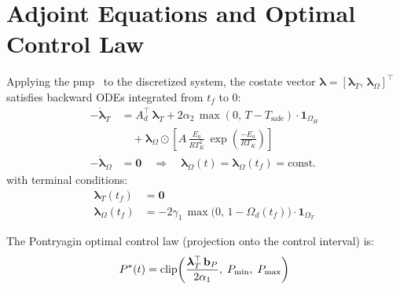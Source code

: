\section{Adjoint Equations and Optimal Control Law}

Applying the \gls{pmp}~\cite{pontryagin2018mathematical} to the
discretized system, the costate vector
$\boldsymbol{\lambda} = [\boldsymbol{\lambda}_T,\, \boldsymbol{\lambda}_\Omega]^\top$
satisfies backward ODEs integrated from $t_f$ to $0$:
\begin{align}
    -\dot{\boldsymbol{\lambda}}_T
    &= A_d^\top\,\boldsymbol{\lambda}_T
       + 2\alpha_2\,\max(0,\, T - T_{\text{safe}})\cdot\mathbf{1}_{\Omega_H}
       \nonumber \\
    &\quad + \boldsymbol{\lambda}_\Omega \odot
       \left[A\,\frac{E_a}{R T_K^2}\,
             \exp\!\left(\frac{-E_a}{R T_K}\right)\right]
    \label{eq:adjoint-T} \\[4pt]
    -\dot{\boldsymbol{\lambda}}_\Omega &= \mathbf{0}
    \quad\Rightarrow\quad
    \boldsymbol{\lambda}_\Omega(t) = \boldsymbol{\lambda}_\Omega(t_f) = \text{const.}
    \label{eq:adjoint-Omega}
\end{align}
with terminal conditions:
\begin{align}
    \boldsymbol{\lambda}_T(t_f) &= \mathbf{0} \\
    \boldsymbol{\lambda}_\Omega(t_f)
    &= -2\gamma_1\,\max\bigl(0,\,1 - \Omega_d(t_f)\bigr)\cdot\mathbf{1}_{\Omega_T}
\end{align}

The Pontryagin optimal control law (projection onto the control interval) is:
\begin{equation}
    P^*(t)
    = \operatorname{clip}\!\left(\frac{\boldsymbol{\lambda}_T^\top\,\mathbf{b}_P}{2\alpha_1},\;
                   P_{\min},\; P_{\max}\right)
    \label{eq:pontryagin}
\end{equation}
